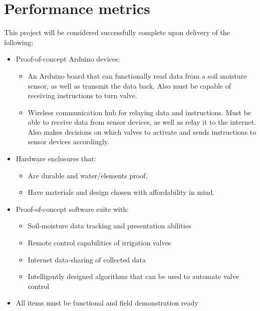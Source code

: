 \documentclass[onecolumn, draftclsnofoot,10pt, compsoc]{IEEEtran}
\begin{document}
	\section{Performance metrics}
	This project will be considered successfully complete upon delivery of the following:
	\begin{itemize}
		\item Proof-of-concept Arduino devices:
		\begin{itemize}
			\item An Arduino board that can functionally read data from a soil moisture sensor, as well as transmit the data back. Also must be capable of receiving instructions to turn valve.
			\item Wireless communication hub for relaying data and instructions. Must be able to receive data from sensor devices, as well as relay it to the internet. Also makes decisions on which valves to activate and sends instructions to sensor devices accordingly.
		\end{itemize}
		\item Hardware enclosures that:
		\begin{itemize}
			\item Are durable and water/elements proof.
			\item Have materials and design chosen with affordability in mind.
		\end{itemize}
		\item Proof-of-concept software suite with:
		\begin{itemize}
			\item Soil-moisture data tracking and presentation abilities
			\item Remote control capabilities of irrigation valves
			\item Internet data-sharing of collected data
			\item Intelligently designed algorithms that can be used to automate valve control        
		\end{itemize}
		\item All items must be functional and field demonstration ready
	\end{itemize}
	\newpage
	
\end{document}
